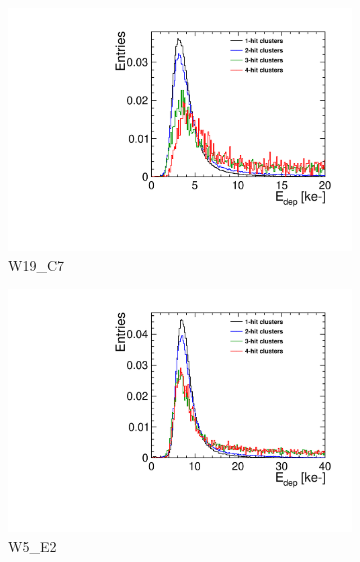 \begin{figure}[htbp] \centering
  \begin{subfigure}[b]{0.3\textwidth}
    \includegraphics[width=\textwidth]{./figures/Calibration/Edep_Clusters_W0019_C07.pdf}
    \caption{W19\_C7}
  \end{subfigure} \hfill
  \begin{subfigure}[b]{0.3\textwidth}
    \includegraphics[width=\textwidth]{./figures/Calibration/Edep_Clusters_W0005_E02.pdf}
    \caption{W5\_E2}
  \end{subfigure}\hfill
  \begin{subfigure}[b]{0.3\textwidth}

\end{subfigure}
\end{figure}
